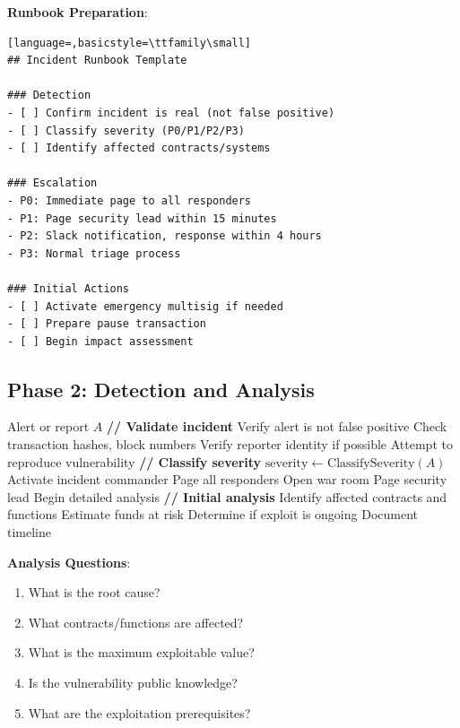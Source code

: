 \documentclass[11pt,a4paper]{article}
\theoremstyle{definition}
\begin{document}
\textbf{Runbook Preparation}:
\begin{lstlisting}[language=,basicstyle=\ttfamily\small]
## Incident Runbook Template

### Detection
- [ ] Confirm incident is real (not false positive)
- [ ] Classify severity (P0/P1/P2/P3)
- [ ] Identify affected contracts/systems

### Escalation
- P0: Immediate page to all responders
- P1: Page security lead within 15 minutes
- P2: Slack notification, response within 4 hours
- P3: Normal triage process

### Initial Actions
- [ ] Activate emergency multisig if needed
- [ ] Prepare pause transaction
- [ ] Begin impact assessment
\end{lstlisting}

\subsection{Phase 2: Detection and Analysis}

\begin{algorithm}
\caption{Incident Detection and Triage}
\begin{algorithmic}[1]
\Require Alert or report $A$
\State \textbf{// Validate incident}
    \State Verify alert is not false positive
    \State Check transaction hashes, block numbers
    \State Verify reporter identity if possible
    \State Attempt to reproduce vulnerability
\EndIf
\Statex
\State \textbf{// Classify severity}
\State $\text{severity} \gets \text{ClassifySeverity}(A)$
    \State Activate incident commander
    \State Page all responders
    \State Open war room
    \State Page security lead
    \State Begin detailed analysis
\EndIf
\Statex
\State \textbf{// Initial analysis}
\State Identify affected contracts and functions
\State Estimate funds at risk
\State Determine if exploit is ongoing
\State Document timeline
\end{algorithmic}
\end{algorithm}

\textbf{Analysis Questions}:
\begin{enumerate}
    \item What is the root cause?
    \item What contracts/functions are affected?
    \item What is the maximum exploitable value?
    \item Is the vulnerability public knowledge?
    \item What are the exploitation prerequisites?
\end{enumerate}
\end{document}
